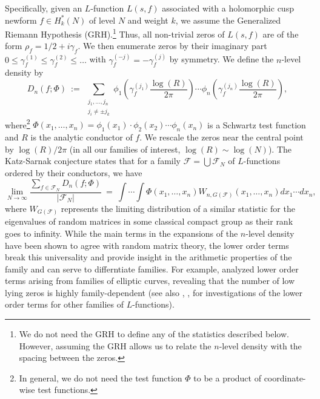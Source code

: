 \documentclass[11pt, reqno]{amsart}
\theoremstyle{definition}
\theoremstyle{remark}
\numberwithin{equation}{section}
\begin{document}
Specifically, given an $L$-function $L(s,f)$ associated with a holomorphic cusp newform $f \in H^*_k(N) $ of level $N$ and weight $k$, we assume the Generalized Riemann Hypothesis (GRH).\footnote{We do not need the GRH to define any of the statistics described below. However, assuming the GRH allows us to relate the $n$-level density with the spacing between the zeros.} Thus, all non-trivial zeros of $L(s,f)$ are of the form $\rho_f=1/2+i\gamma_f$. We then enumerate zeros by their imaginary part $0 \leq \gamma_f^{(1)}\leq \gamma_f^{(2)}\leq \ldots$ with $\gamma_f^{(-j)}=-\gamma_f^{(j)}$ by symmetry. We define the $n$-level density by 
 \begin{equation}
    D_n(f;\Phi)\ :=\ \sum_{\substack{j_1,\ldots,j_n\\j_i \neq \pm j_k}}\phi_1\left( \gamma^{(j_1)}_f \frac{\log (R)}{2\pi}\right)\cdots \phi_n\left( \gamma^{(j_n)}_f \frac{\log (R)}{2\pi}\right),
 \end{equation}
 where\footnote{In general, we do not need the test function $\Phi$ to be a product of coordinate-wise test functions.} $\Phi(x_1, \ldots, x_n)=\phi_1(x_1)\cdot \phi_2(x_2)\cdots\phi_n(x_n)$ is a Schwartz test function and $R$ is the analytic conductor of $f$. We rescale the zeros near the central point by $\log (R)/2\pi$ (in all our families of interest, $\log( R) \sim \log(N)$). The Katz-Sarnak conjecture states that for a family $\mathcal{F}=\bigcup\mathcal{F}_N$ of $L$-functions ordered by their conductors, we have
 \begin{equation}
     \lim_{N\to \infty}\frac{\sum_{f\in \mathcal{F}_N}D_n(f;\Phi)}{|\mathcal{F}_N|}\ =\ \int \cdots\int \Phi(x_1,\ldots, x_n)W_{n, G(\mathcal{F})}(x_1,\ldots,x_n)dx_1\cdots dx_n,
 \end{equation}
where $W_{G(\mathcal{F})}$ represents the limiting distribution of a similar statistic for the eigenvalues of random matrices in some classical compact group as their rank goes to infinity. While the main terms in the expansions of the $n$-level density have been shown to agree with random matrix theory, the lower order terms break this universality and provide insight in the arithmetic properties of the family and can serve to differntiate families. For example, \cite{young2005lower} analyzed lower order terms arising from families of elliptic curves, revealing that the number of low lying zeros is highly family-dependent (see also \cite{GAO_ZHAO_2023}, \cite{Fiorilli_2015}, \cite{Fourvy_2003} for investigations of the lower order terms for other families of $L$-functions). 
\end{document}
